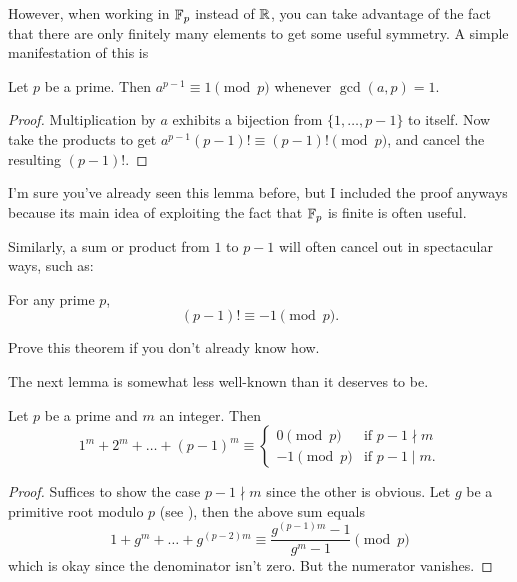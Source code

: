 \documentclass[11pt]{scrartcl}
\begin{document}
However, when working in $\mathbb F_p$ instead of $\mathbb R$, you can take advantage
of the fact that there are only finitely many elements to get some useful symmetry.
A simple manifestation of this is 
\begin{lemma}
	Let $p$ be a prime. Then $a^{p-1} \equiv 1 \pmod p$ whenever $\gcd(a,p) = 1$.
\end{lemma}
\begin{proof}
	Multiplication by $a$ exhibits a bijection
	from $\{1, \dots, p-1\}$ to itself.
	Now take the products to get $a^{p-1} (p-1)! \equiv (p-1)! \pmod p$,
	and cancel the resulting $(p-1)!$.
\end{proof}
I'm sure you've already seen this lemma before,
but I included the proof anyways because its main idea of
exploiting the fact that $\mathbb F_p$ is finite is often useful.

Similarly, a sum or product from $1$ to $p-1$
will often cancel out in spectacular ways, such as:
\begin{lemma}
	For any prime $p$,
	\[ (p-1)! \equiv -1 \pmod p. \]
\end{lemma}
\begin{exercise}
	Prove this theorem if you don't already know how.
\end{exercise}

The next lemma is somewhat less well-known than it deserves to be.
\begin{lemma}
	\label{lem:powersum_modp}
	Let $p$ be a prime and $m$ an integer.
	Then
	\[ 1^m + 2^m + \dots + (p-1)^m \equiv 
		\begin{cases}
			0 \pmod p & \text{if } p-1 \nmid m \\
			-1 \pmod p & \text{if } p-1 \mid m.
		\end{cases} \]
\end{lemma}
\begin{proof}
	Suffices to show the case $p-1 \nmid m$ since the other is obvious.
	Let $g$ be a primitive root modulo $p$ (see \cite{ref:ORPR}),
	then the above sum equals 
	\[ 1 + g^m + \dots + g^{(p-2)m}
		\equiv \frac{g^{(p-1)m} - 1}{g^m-1} \pmod p \]
	which is okay since the denominator isn't zero.
	But the numerator vanishes.
\end{proof}
\end{document}
